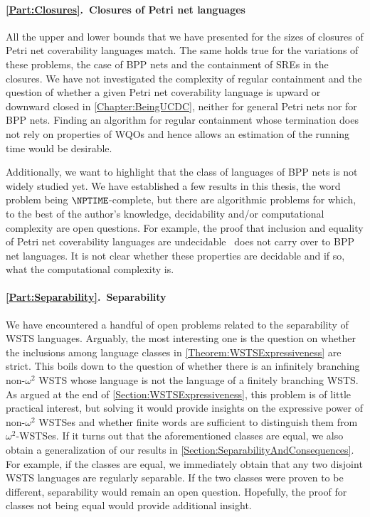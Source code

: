 \documentclass[../../diss.tex]{subfiles}
\begin{document}
\paragraph{\cref{Part:Closures}.~Closures of Petri net languages}

All the upper and lower bounds that we have presented for the sizes of closures of Petri net coverability languages match.
The same holds true for the variations of these problems, \eg the case of BPP nets and the containment of SREs in the closures.
We have not investigated the complexity of regular containment and the question of whether a given Petri net coverability language is upward or downward closed in \cref{Chapter:BeingUCDC}, neither for general Petri nets nor for BPP nets.
Finding an algorithm for regular containment whose termination does not rely on properties of WQOs and hence allows an estimation of the running time would be desirable.

Additionally, we want to highlight that the class of languages of BPP nets is not widely studied yet.
We have established a few results in this thesis, \eg the word problem being $\NPTIME$-complete, but there are algorithmic problems for which, to the best of the author's knowledge, decidability and/or computational complexity are open questions.
For example, the proof that inclusion and equality of Petri net coverability languages are undecidable~\cite{Jancar95, Wimmel08} does not carry over to BPP net languages.
It is not clear whether these properties are decidable and if so, what the computational complexity is.

\paragraph{\cref{Part:Separability}.~Separability}

We have encountered a handful of open problems related to the separability of WSTS languages.
Arguably, the most interesting one is the question on whether the inclusions among language classes in \cref{Theorem:WSTSExpressiveness} are strict.
This boils down to the question of whether there is an infinitely branching non-$\omega^2$ WSTS whose language is not the language of a finitely branching WSTS.\@
As argued at the end of \cref{Section:WSTSExpressiveness}, this problem is of little practical interest, but solving it would provide insights on the expressive power of non-$\omega^2$ WSTSes and whether finite words are sufficient to distinguish them from $\omega^2$-WSTSes.
If it turns out that the aforementioned classes are equal, we also obtain a generalization of our results in \cref{Section:SeparabilityAndConsequences}.
For example, if the classes are equal, we immediately obtain that any two disjoint WSTS languages are regularly separable.
If the two classes were proven to be different, separability would remain an open question.
Hopefully, the proof for classes not being equal would provide additional insight.
\end{document}
